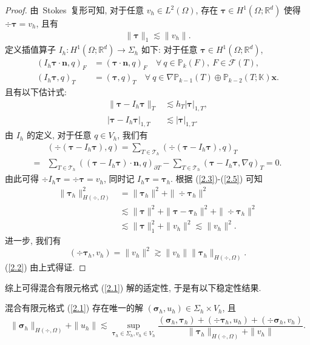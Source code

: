 \begin{proof}
由~Stokes~复形可知, 对于任意 $v_h\in L^2(\Omega)$, 存在 $\boldsymbol\tau\in H^1(\Omega;\mathbb{R}^d)$ 使得
$\div\boldsymbol\tau=v_h$, 且有
\begin{align}\label{2.3}
\|\boldsymbol\tau\|_1\lesssim\|v_h\|.
\end{align}
定义插值算子 $I_h:H^1(\Omega;\mathbb{R}^d)\rightarrow\Sigma_h$ 如下: 对于任意 $\boldsymbol\tau\in H^1(\Omega;\mathbb{R}^d)$, 
\begin{align*}
(I_h\boldsymbol\tau\cdot\boldsymbol{n}, q)_F&=(\boldsymbol\tau\cdot\boldsymbol{n}, q)_F \quad \forall \ q\in\mathbb{P}_{k}(F), \ F\in\mathcal{F}(T),\\
(I_h\boldsymbol\tau, q)_T&=(\boldsymbol\tau, q)_T \quad \forall \ q\in\nabla\mathbb{P}_{k-1}(T)\oplus \mathbb{P}_{k-2}(T;\mathbb{K})\boldsymbol{x}.
\end{align*}
且有以下估计式:
\begin{align}
\label{2.4}
\|\boldsymbol\tau-I_h\boldsymbol\tau\|_{T}&\lesssim h_T|\boldsymbol\tau|_{1,T},\\
\label{2.5}
|\boldsymbol\tau-I_h\boldsymbol\tau|_{1,T}&\lesssim |\boldsymbol\tau|_{1,T}.
\end{align}
由 $I_h$ 的定义, 对于任意 $q\in V_h$, 我们有
\begin{align*}
&(\div(\boldsymbol\tau-I_h\boldsymbol\tau), q)=\sum_{T\in\mathcal{T}_h}(\div(\boldsymbol\tau-I_h\boldsymbol\tau), q)_T\\
=&\sum_{T\in\mathcal{T}_h}((\boldsymbol\tau-I_h\boldsymbol\tau)\cdot\boldsymbol{n}, q)_{\partial T}-\sum_{T\in\mathcal{T}_h}(\boldsymbol\tau-I_h\boldsymbol\tau, \nabla q)_T=0.
\end{align*}
由此可得 $\div I_h\boldsymbol\tau=\div\boldsymbol\tau=v_h$, 同时记 $I_h\boldsymbol\tau=\boldsymbol\tau_h$.
根据 (\ref{2.3})-(\ref{2.5}) 可知
\begin{align*}
\|\boldsymbol\tau_h\|^2_{H(\div,\Omega)}&=\|\boldsymbol\tau_h\|^2+\|\div\boldsymbol\tau_h\|^2\\
&\lesssim\|\boldsymbol\tau\|^2+\|\boldsymbol\tau-\boldsymbol\tau_h\|^2+\|\div\boldsymbol\tau_h\|^2\\
&\lesssim\|\boldsymbol\tau\|^2_1+\|v_h\|^2\lesssim\|v_h\|^2.
\end{align*}
进一步, 我们有
$$(\div\boldsymbol\tau_h, v_h)=\|v_h\|^2\gtrsim\|v_h\|\|\boldsymbol\tau_h\|_{H(\div,\Omega)}.$$
(\ref{2.2}) 由上式得证.
\end{proof}

综上可得混合有限元格式 (\ref{2.1}) 解的适定性, 于是有以下稳定性结果.
\begin{theorem}
混合有限元格式 (\ref{2.1}) 存在唯一的解 $(\boldsymbol\sigma_h, u_h)\in \Sigma_h\times V_h$, 且
\begin{align}
\label{2.6}
\|\boldsymbol\sigma_h\|_{H(\div,\Omega)}+\|u_h\|\lesssim\sup_{\boldsymbol\tau_h\in \Sigma_h, v_h\in V_h}\dfrac{(\boldsymbol\sigma_h, \boldsymbol\tau_h)+(\div\boldsymbol\tau_h, u_h)+(\div\boldsymbol\sigma_h, v_h)}{\|\boldsymbol\tau_h\|_{H(\div,\Omega)}+\|v_h\|}.
\end{align}
\end{theorem}


